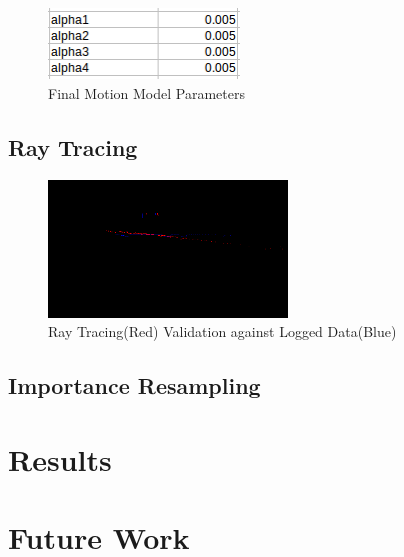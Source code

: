 \documentclass{article}
\begin{document}
\begin{figure}[!h]
    \centering
    \includegraphics[width=2.0in]{media/motion_model_parameters.png}
    \caption{Final Motion Model Parameters}
\label{fig:4}
\end{figure}

\subsection{Ray Tracing}

\begin{figure}[!h]
    \centering
    \includegraphics[width=2.5in]{media/ray_tracing.png}
    \caption{Ray Tracing(Red) Validation against Logged Data(Blue)}
\label{fig53}
\end{figure}

\subsection{Importance Resampling}


\section{Results}

\section{Future Work}
\end{document}
